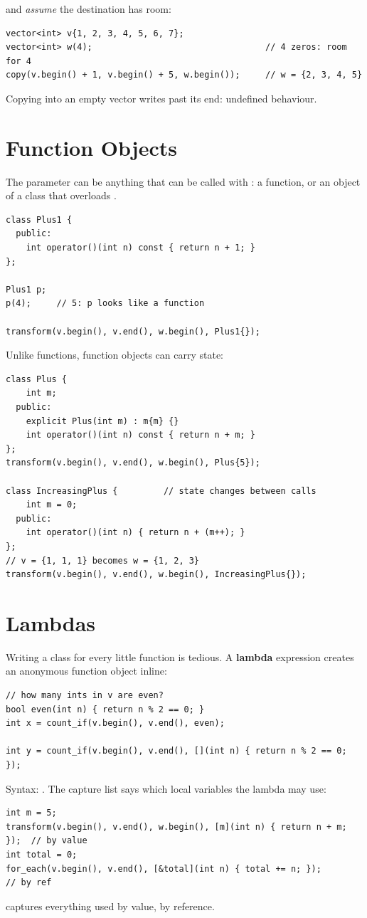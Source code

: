 \begin{important}
 and  \emph{assume} the destination has room:
\begin{lstlisting}[style=cpp]
vector<int> v{1, 2, 3, 4, 5, 6, 7};
vector<int> w(4);                                  // 4 zeros: room for 4
copy(v.begin() + 1, v.begin() + 5, w.begin());     // w = {2, 3, 4, 5}
\end{lstlisting}
Copying into an empty vector writes past its end: undefined behaviour.
\end{important}

\section{Function Objects}
The parameter  can be anything that can be called with \code{()}: a
function, or an object of a class that overloads .
\begin{lstlisting}[style=cpp]
class Plus1 {
  public:
    int operator()(int n) const { return n + 1; }
};

Plus1 p;
p(4);     // 5: p looks like a function

transform(v.begin(), v.end(), w.begin(), Plus1{});
\end{lstlisting}
Unlike functions, function objects can carry state:
\begin{lstlisting}[style=cpp]
class Plus {
    int m;
  public:
    explicit Plus(int m) : m{m} {}
    int operator()(int n) const { return n + m; }
};
transform(v.begin(), v.end(), w.begin(), Plus{5});

class IncreasingPlus {         // state changes between calls
    int m = 0;
  public:
    int operator()(int n) { return n + (m++); }
};
// v = {1, 1, 1} becomes w = {1, 2, 3}
transform(v.begin(), v.end(), w.begin(), IncreasingPlus{});
\end{lstlisting}

\section{Lambdas}
Writing a class for every little function is tedious. A \textbf{lambda}
expression creates an anonymous function object inline:
\begin{lstlisting}[style=cpp]
// how many ints in v are even?
bool even(int n) { return n % 2 == 0; }
int x = count_if(v.begin(), v.end(), even);

int y = count_if(v.begin(), v.end(), [](int n) { return n % 2 == 0; });
\end{lstlisting}
Syntax: . The capture list says which
local variables the lambda may use:
\begin{lstlisting}[style=cpp]
int m = 5;
transform(v.begin(), v.end(), w.begin(), [m](int n) { return n + m; });  // by value
int total = 0;
for_each(v.begin(), v.end(), [&total](int n) { total += n; });          // by ref
\end{lstlisting}
\code{[=]} captures everything used by value, \code{[\&]} by reference.

